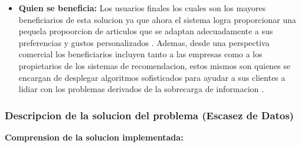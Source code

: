 \documentclass[12pt]{article}
\begin{document}
\begin{itemize}
	\item \textbf{Quien se beneficia:} Los usuarios finales los cuales son los mayores beneficiarios de esta solucion ya que ahora el sistema logra proporcionar una pequela propoorcion de articulos que se adaptan adecuadamente a sus preferencias y gustos personalizados \cite{DBLP:journals/corr/abs-2005-08148}. Ademas, desde una perspectiva comercial los beneficiarios incluyen tanto a las empresas como a los propietarios de los sistemas de recomendacion, estos mismos son quienes se encargan de desplegar algoritmos sofisticados para ayudar a sus clientes a lidiar con los problemas derivados de la sobrecarga de informacion \cite{DBLP:journals/corr/abs-2005-08148}.

\end{itemize}

\subsubsection{Descripcion de la solucion del problema (Escasez de Datos)}
\textbf{Comprension de la solucion implementada: }
\end{document}
